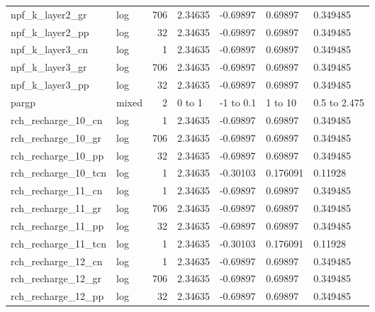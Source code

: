 \documentclass{article}
\begin{document}
\begin{center}
\begin{landscape}
\begin{longtable}{llrllll}
    npf\_k\_layer2\_gr &       log &    706 &        2.34635 &       -0.69897 &        0.69897 &           0.349485 \\
    npf\_k\_layer2\_pp &       log &     32 &        2.34635 &       -0.69897 &        0.69897 &           0.349485 \\
    npf\_k\_layer3\_cn &       log &      1 &        2.34635 &       -0.69897 &        0.69897 &           0.349485 \\
    npf\_k\_layer3\_gr &       log &    706 &        2.34635 &       -0.69897 &        0.69897 &           0.349485 \\
    npf\_k\_layer3\_pp &       log &     32 &        2.34635 &       -0.69897 &        0.69897 &           0.349485 \\
              pargp &     mixed &      2 &     0 to     1 &    -1 to   0.1 &     1 to    10 &       0.5 to 2.475 \\
 rch\_recharge\_10\_cn &       log &      1 &        2.34635 &       -0.69897 &        0.69897 &           0.349485 \\
 rch\_recharge\_10\_gr &       log &    706 &        2.34635 &       -0.69897 &        0.69897 &           0.349485 \\
 rch\_recharge\_10\_pp &       log &     32 &        2.34635 &       -0.69897 &        0.69897 &           0.349485 \\
rch\_recharge\_10\_tcn &       log &      1 &        2.34635 &       -0.30103 &       0.176091 &            0.11928 \\
 rch\_recharge\_11\_cn &       log &      1 &        2.34635 &       -0.69897 &        0.69897 &           0.349485 \\
 rch\_recharge\_11\_gr &       log &    706 &        2.34635 &       -0.69897 &        0.69897 &           0.349485 \\
 rch\_recharge\_11\_pp &       log &     32 &        2.34635 &       -0.69897 &        0.69897 &           0.349485 \\
rch\_recharge\_11\_tcn &       log &      1 &        2.34635 &       -0.30103 &       0.176091 &            0.11928 \\
 rch\_recharge\_12\_cn &       log &      1 &        2.34635 &       -0.69897 &        0.69897 &           0.349485 \\
 rch\_recharge\_12\_gr &       log &    706 &        2.34635 &       -0.69897 &        0.69897 &           0.349485 \\
 rch\_recharge\_12\_pp &       log &     32 &        2.34635 &       -0.69897 &        0.69897 &           0.349485 \\

\end{longtable}
\end{landscape}
\end{center}
\end{document}
